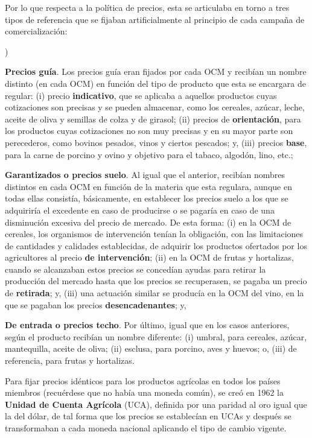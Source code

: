 \documentclass[10pt,a4paper]{article}
\newcounter{alphaitem}
\newenvironment{la}
      {\begin{list}{\alph{alphaitem})}{%
          \usecounter{alphaitem}%
          \setlength{\leftmargin}{1cm}%
          \setlength{\parskip}{3pt}%
          \setlength{\itemsep}{0pt}%
          \setlength{\parsep}{0pt}%
      }}
      {\end{list}}
\begin{document}
Por lo que respecta a la política de precios, esta se articulaba en torno a tres tipos de referencia que se fijaban artificialmente al principio de cada campaña de comercialización:
\begin{la}
    \item \textbf{Precios guía}. Los precios guía eran fijados por cada OCM y recibían un nombre distinto (en cada OCM) en función del tipo de producto que esta se encargara de regular: (i) precio \textbf{indicativo}, que se aplicaba a aquellos productos cuyas cotizaciones son precisas y se pueden almacenar, como los cereales, azúcar, leche, aceite de oliva y semillas de colza y de girasol; (ii) precios de \textbf{orientación}, para los productos cuyas cotizaciones no son muy precisas y en su mayor parte son perecederos, como bovinos pesados, vinos y ciertos pescados; y, (iii) precios \textbf{base}, para la carne de porcino y ovino y objetivo para el tabaco, algodón, lino, etc.; 
    \item \textbf{Garantizados o precios suelo}. Al igual que el anterior, recibían nombres distintos en cada OCM en función de la materia que esta regulara, aunque en todas ellas consistía, básicamente, en establecer los precios suelo a los que se adquiriría el excedente en caso de producirse o se pagaría en caso de una disminución excesiva del precio de mercado. De esta forma: (i) en la OCM de cereales, los organismos de intervención tenían la obligación, con las limitaciones de cantidades y calidades establecidas, de adquirir los productos ofertados por los agricultores al precio \textbf{de intervención}; (ii) en la OCM de frutas y hortalizas, cuando se alcanzaban estos precios se concedían ayudas para retirar la producción del mercado hasta que los precios se recuperasen, se pagaba un precio de \textbf{retirada}; y, (iii) una actuación similar se producía en la OCM del vino, en la que se pagaban los precios \textbf{desencadenantes}; y,
    \item \textbf{De entrada o precios techo}. Por último, igual que en los casos anteriores, según el producto recibían un nombre diferente: (i) umbral, para cereales, azúcar, mantequilla, aceite de oliva; (ii) esclusa, para porcino, aves y huevos; o, (iii) de referencia, para frutas y hortalizas.
\end{la}

Para fijar precios idénticos para los productos agrícolas en todos los países miembros (recuérdese que no había una moneda común), se creó en 1962 la \textbf{Unidad de Cuenta Agrícola} (UCA), definida por una paridad al oro igual que la del dólar, de tal forma que los precios se establecían en UCAs y después se transformaban a cada moneda nacional aplicando el tipo de cambio vigente. 
\end{document}
